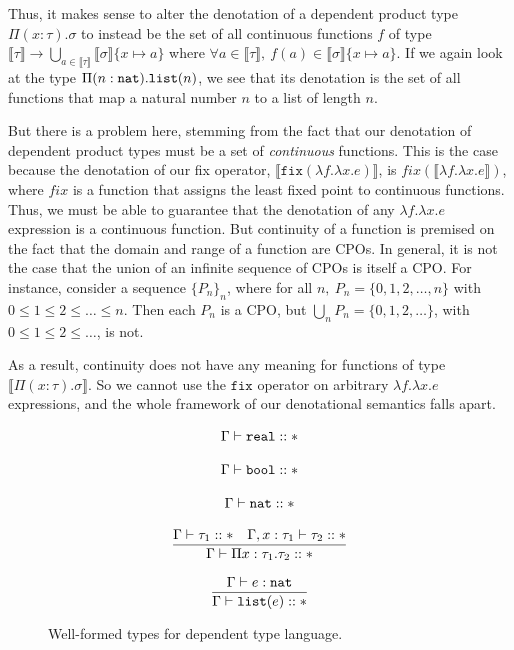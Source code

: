 Thus, it makes sense to alter the denotation of a dependent product type $\Pi(x:\tau).\sigma$ to instead be the set of all
continuous functions $f$ 
of type $\llbracket \tau \rrbracket \rightarrow \bigcup_{a \in \llbracket \tau \rrbracket} \llbracket \sigma \rrbracket\{x \mapsto a\}$
where $\forall a \in \llbracket \tau \rrbracket, \ f(a) \in \llbracket \sigma \rrbracket\{x \mapsto a\}$. If we again look at the 
type $\Pi(n:\texttt{nat}).\texttt{list}(n)$, we see that its denotation is the set of all functions that map a natural number $n$ 
to a list of length $n$.

But there is a problem here, stemming from the fact that our denotation of dependent product types must be a 
set of \emph{continuous} functions. This is the case because the denotation of our fix operator,
$\llbracket \texttt{fix}(\lambda f. \lambda x.e) \rrbracket$, is $fix(\llbracket \lambda f. \lambda x.e \rrbracket)$, where $fix$ 
is a function that assigns the least fixed point to continuous functions. Thus, we must be able to guarantee that the denotation of any $\lambda f. \lambda x.e$ expression is a continuous function. But continuity of a function is premised on the fact that the domain and range of
a function are CPOs. In general, it is not the case that the union of an infinite sequence of CPOs is itself a CPO. For 
instance, consider a sequence $\{P_n\}_n$, where for all $n, \ P_n = \{0, 1, 2, \dots, n\}$ with 
$0 \leq 1 \leq 2 \leq \dots \leq n$. Then each $P_n$ is a CPO, but $\bigcup_n P_n = \{0, 1, 2, \dots\}$, with
$0 \leq 1 \leq 2 \leq \dots$, is not. 

As a result, continuity does not have any meaning for functions of type $\llbracket \Pi (x: \tau).\sigma \rrbracket$. 
So we cannot use the $\texttt{fix}$ operator on arbitrary $\lambda f. \lambda x.e$ expressions, and the whole
framework of our denotational semantics falls apart. 
 
 \begin{figure}
\[
\begin{array}{c}
\Gamma \vdash \texttt{real} :: * \\ \\
\Gamma \vdash \texttt{bool} :: *\\ \\
\Gamma \vdash \texttt{nat} :: * \\ \\ 
\dfrac{\Gamma \vdash \tau_1 :: * \ \ \ \Gamma, x:\tau_1 \vdash \tau_2 :: *}{\Gamma \vdash \Pi x:\tau_1.\tau_2 :: *} \\ \\
\dfrac{\Gamma \vdash e : \texttt{nat}}{\Gamma \vdash \texttt{list}(e) :: *} 
\end{array}
\]
\caption{Well-formed types for dependent type language.}
\end{figure}

